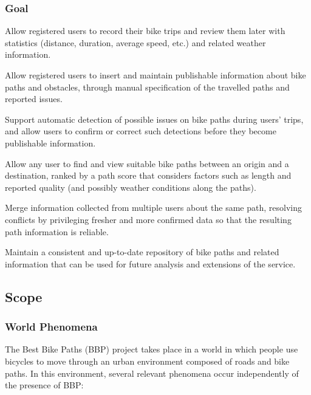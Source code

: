 \subsubsection{Goal}
\begin{goalpoints}
	\item[G1] Allow registered users to record their bike trips and review them later with statistics (distance, duration, average speed, etc.) and related weather information.
	\item[G2] Allow registered users to insert and maintain publishable information about bike paths and obstacles, through manual specification of the travelled paths and reported issues.
	\item[G3] Support automatic detection of possible issues on bike paths during users' trips, and allow users to confirm or correct such detections before they become publishable information.
	\item[G4] Allow any user to find and view suitable bike paths between an origin and a destination, ranked by a path score that considers factors such as length and reported quality (and possibly weather conditions along the paths).
	\item[G5] Merge information collected from multiple users about the same path, resolving conflicts by privileging fresher and more confirmed data so that the resulting path information is reliable.
	\item[G6] Maintain a consistent and up-to-date repository of bike paths and related information that can be used for future analysis and extensions of the service.  
\end{goalpoints}


\subsection{Scope}

\subsubsection{World Phenomena}
The Best Bike Paths (BBP) project takes place in a world in which people use bicycles to move through an urban environment composed of roads and bike paths. In this environment, several relevant phenomena occur independently of the presence of BBP:\

